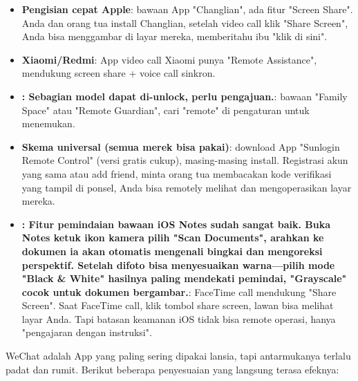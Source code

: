 \begin{itemize}
  \item \textbf{Pengisian cepat Apple}: bawaan App "Changlian", ada fitur "Screen Share". Anda dan orang tua install Changlian, setelah video call klik "Share Screen", Anda bisa menggambar di layar mereka, memberitahu ibu "klik di sini".
  \item \textbf{Xiaomi/Redmi}: App video call Xiaomi punya "Remote Assistance", mendukung screen share + voice call sinkron.
  \item \textbf{: Sebagian model dapat di-unlock, perlu pengajuan.}: bawaan "Family Space" atau "Remote Guardian", cari "remote" di pengaturan untuk menemukan.
  \item \textbf{Skema universal (semua merek bisa pakai)}: download App "Sunlogin Remote Control" (versi gratis cukup), masing-masing install. Registrasi akun yang sama atau add friend, minta orang tua membacakan kode verifikasi yang tampil di ponsel, Anda bisa remotely melihat dan mengoperasikan layar mereka.
  \item \textbf{: Fitur pemindaian bawaan iOS Notes sudah sangat baik. Buka Notes ketuk ikon kamera pilih "Scan Documents", arahkan ke dokumen ia akan otomatis mengenali bingkai dan mengoreksi perspektif. Setelah difoto bisa menyesuaikan warna—pilih mode "Black \& White" hasilnya paling mendekati pemindai, "Grayscale" cocok untuk dokumen bergambar.}: FaceTime call mendukung "Share Screen". Saat FaceTime call, klik tombol share screen, lawan bisa melihat layar Anda. Tapi batasan keamanan iOS tidak bisa remote operasi, hanya "pengajaran dengan instruksi".
\end{itemize}


WeChat adalah App yang paling sering dipakai lansia, tapi antarmukanya terlalu padat dan rumit. Berikut beberapa penyesuaian yang langsung terasa efeknya:

